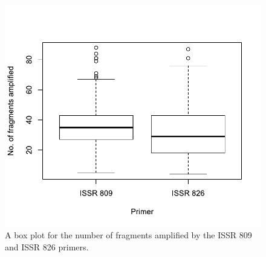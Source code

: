 \vspace{0.5cm}
\begin{table}[h]

\caption{Summary of the number of loci, the average number of bands obtained, standard deviations, the maximum and minimum number of peaks yielded, and the Euclidean and Jaccard error rates for ISSR primers 809 and 826. Values were obtained after conservative filtering parameters had been applied to the data in RawGeno, and are representative of all the individuals for each primer's data set.}
\vspace{0.5cm}
\label{tab:issr_primer_stats}

\end{table}

\begin{figure}[H]
	\centering
	\includegraphics[scale =0.75]{Images/number_fragments_amplified.pdf}
	\caption{A box plot for the number of fragments amplified by the ISSR 809 and ISSR 826 primers.}
	\label{fig:primer_bands}
\end{figure}

